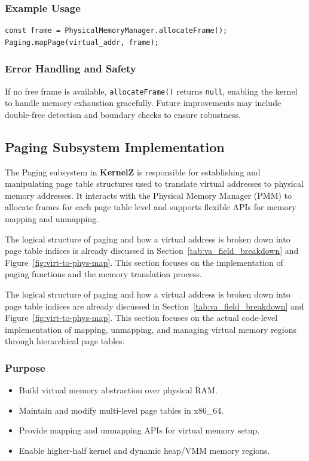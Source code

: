 \documentclass[12pt]{extarticle}
\begin{document}
\subsubsection*{Example Usage}

\begin{lstlisting}
const frame = PhysicalMemoryManager.allocateFrame();
Paging.mapPage(virtual_addr, frame);
\end{lstlisting}

\subsubsection*{Error Handling and Safety}

If no free frame is available, \texttt{allocateFrame()} returns \texttt{null}, enabling the kernel to handle memory exhaustion gracefully. Future improvements may include double-free detection and boundary checks to ensure robustness.
\pagebreak

\subsection{Paging Subsystem Implementation}

The Paging subsystem in \textbf{KernelZ} is responsible for establishing and manipulating page table structures used to translate virtual addresses to physical memory addresses. It interacts with the Physical Memory Manager (PMM) to allocate frames for each page table level and supports flexible APIs for memory mapping and unmapping.

The logical structure of paging and how a virtual address is broken down into page table indices is already discussed in Section~\ref{tab:va_field_breakdown} and Figure~\ref{fig:virt-to-phys-map}. This section focuses on the implementation of paging functions and the memory translation process.


The logical structure of paging and how a virtual address is broken down into page table indices are already discussed in Section~\ref{tab:va_field_breakdown} and Figure~\ref{fig:virt-to-phys-map}. This section focuses on the actual code-level implementation of mapping, unmapping, and managing virtual memory regions through hierarchical page tables.

\subsubsection*{Purpose}

\begin{itemize}
  \item Build virtual memory abstraction over physical RAM.
  \item Maintain and modify multi-level page tables in x86\_64.
  \item Provide mapping and unmapping APIs for virtual memory setup.
  \item Enable higher-half kernel and dynamic heap/VMM memory regions.
\end{itemize}
\end{document}
